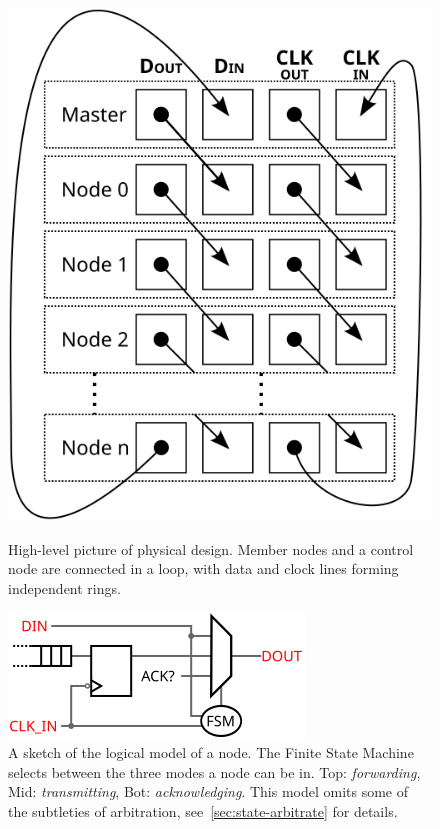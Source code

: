\begin{figure}
  \begin{minipage}[b]{.48\linewidth}
    \centering
    \includegraphics[width=0.5\linewidth]{img/stacked_layers}
    \caption{High-level picture of \bus physical design. Member nodes and a
    control node are connected in a loop, with data and clock lines forming
    independent rings.
    }
    \label{fig:bus}
  \end{minipage}
  \hspace{1 em}
  \begin{minipage}[b]{.48\linewidth}
    \centering
    \includegraphics[width=\textwidth]{img/logical}
    \caption{A sketch of the logical model of a node. The Finite State Machine
  selects between the three modes a node can be in. Top: {\em forwarding}, Mid:
  {\em transmitting}, Bot: {\em acknowledging}. This model omits some of the
  subtleties of arbitration, see~\ref{sec:state-arbitrate} for details.
    }
    \label{fig:logical}
  \end{minipage}
\end{figure}

